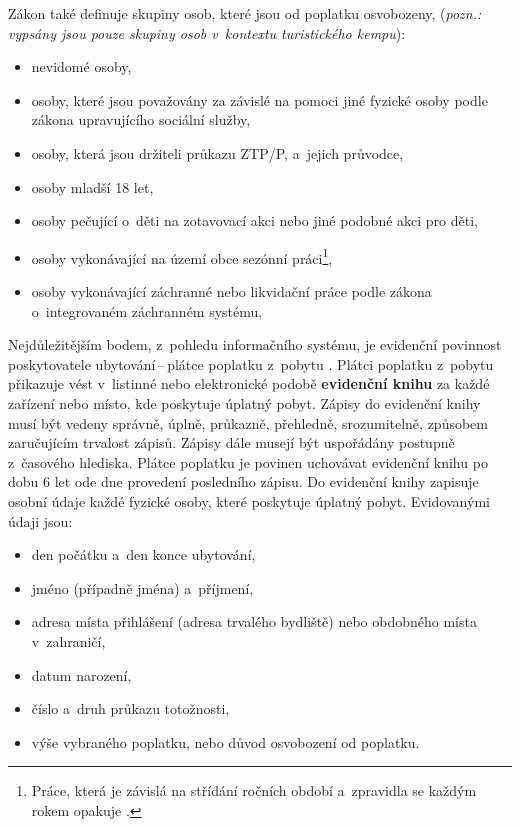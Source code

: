 \noindent
Zákon také definuje skupiny osob, které jsou od poplatku osvobozeny, \cite[\S~3b]{cz-1990-565} (\textit{pozn.: vypsány jsou pouze skupiny osob v~kontextu turistického kempu}):
\begin{itemize}
    \item nevidomé osoby,
    \item osoby, které jsou považovány za závislé na pomoci jiné fyzické osoby podle zákona upravujícího sociální služby,
    \item osoby, která jsou držiteli průkazu ZTP/P, a~jejich průvodce,
    \item osoby mladší 18 let,
    \item osoby pečující o~děti na zotavovací akci nebo jiné podobné akci pro děti,
    \item osoby vykonávající na území obce sezónní práci\footnote{Práce, která je závislá na střídání ročních období a~zpravidla se každým rokem opakuje \cite[\S~3b~(3)]{cz-1990-565}.},
    \item osoby vykonávající záchranné nebo likvidační práce podle zákona o~integrovaném záchranném systému,
\end{itemize}

Nejdůležitějším bodem, z~pohledu informačního systému, je evidenční povinnost poskytovatele ubytování\,--\,plátce poplatku z~pobytu \cite[\S~3g]{cz-1990-565}.
Plátci poplatku z~pobytu přikazuje vést v~listinné nebo elektronické podobě \textbf{evidenční knihu} za každé zařízení nebo místo, kde poskytuje úplatný pobyt.
Zápisy do evidenční knihy musí být vedeny správně, úplně, průkazně, přehledně, srozumitelně, způsobem zaručujícím trvalost zápisů.
Zápisy dále musejí být uspořádány postupně z~časového hlediska.
Plátce poplatku je povinen uchovávat evidenční knihu po dobu 6 let ode dne provedení posledního zápisu.
Do evidenční knihy zapisuje osobní údaje každé fyzické osoby, které poskytuje úplatný pobyt.
Evidovanými údaji jsou:
\begin{itemize}
    \item den počátku a~den konce ubytování,
    \item jméno (případně jména) a~příjmení,
    \item adresa místa přihlášení (adresa trvalého bydliště) nebo obdobného místa v~zahraničí,
    \item datum narození,
    \item číslo a~druh průkazu totožnosti,
    \item výše vybraného poplatku, nebo důvod osvobození od poplatku.
\end{itemize}

